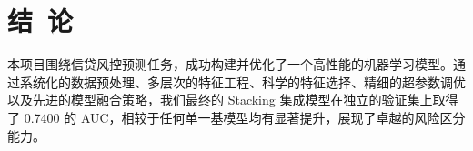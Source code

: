 \documentclass{thuemp}
\begin{document}
\section{结~论}
本项目围绕信贷风控预测任务，成功构建并优化了一个高性能的机器学习模型。通过系统化的数据预处理、多层次的特征工程、科学的特征选择、精细的超参数调优以及先进的模型融合策略，我们最终的 Stacking 集成模型在独立的验证集上取得了 0.7400 的 AUC，相较于任何单一基模型均有显著提升，展现了卓越的风险区分能力。


\renewcommand\refname{\heiti\wuhao\centerline{参考文献}\global\def\refname{参考文献}}
\vskip 12pt

\let\OLDthebibliography\thebibliography
\renewcommand\thebibliography[1]{
  \OLDthebibliography{#1}
  \setlength{\parskip}{0pt}
  \setlength{\itemsep}{0pt plus 0.3ex}
}

{
\renewcommand{\baselinestretch}{0.9}
\liuhao


}
\end{document}
